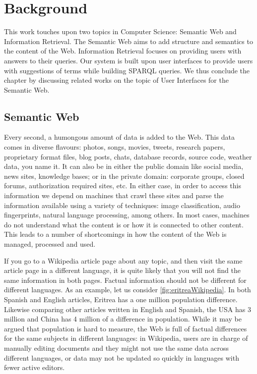 \chapter{Background}
\label{chap:background}

This work touches upon two topics in Computer Science: Semantic Web and Information Retrieval. The Semantic Web aims to add structure and semantics to the content of the Web. Information Retrieval focuses on providing users with answers to their queries. Our system is built upon user interfaces to provide users with suggestions of terms while building SPARQL queries. We thus conclude the chapter by discussing related works on the topic of User Interfaces for the Semantic Web.


\section{Semantic Web}

Every second, a humongous amount of data is added to the Web. This data comes in diverse flavours: photos, songs, movies, tweets, research papers, proprietary format files, blog posts, chats, database records, source code, weather data, you name it. It can also be in either the public domain like social media, news sites, knowledge bases; or in the private domain: corporate groups, closed forums, authorization required sites, etc. In either case, in order to access this information we depend on machines that crawl these sites and parse the information available using a variety of techniques: image classification, audio fingerprints, natural language processing, among others. In most cases, machines do not understand what the content is or how it is connected to other content. This leads to a number of shortcomings in how the content of the Web is managed, processed and used.

If you go to a Wikipedia article page about any topic, and then visit the same article page in a different language, it is quite likely that you will not find the same information in both pages. Factual information should not be different for different languages. As an example, let us consider \autoref{fig:eritreaWikipedia}. In both Spanish and English articles, Eritrea has a one million population difference. Likewise comparing other articles written in English and Spanish, the USA has 3 million and China has 4 million of a difference in population. While it may be argued that population is hard to measure, the Web is full of factual differences for the same subjects in different languages: in Wikipedia, users are in charge of manually editing documents and they might not use the same data across different languages, or data may not be updated so quickly in languages with fewer active editors.

